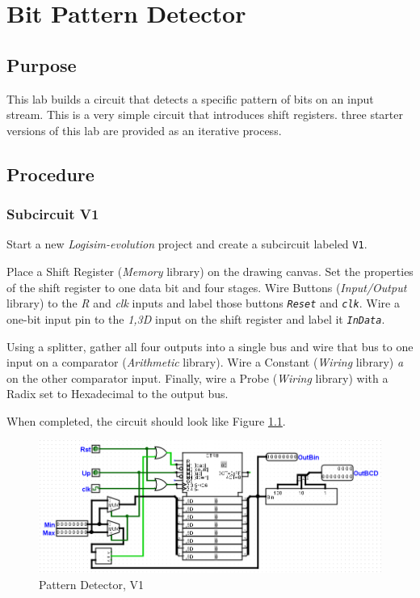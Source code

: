 \chapter{Bit Pattern Detector}

\section{Purpose}

This lab builds a circuit that detects a specific pattern of bits on an input stream. This is a very simple circuit that introduces shift registers. three starter versions of this lab are provided as an iterative process.

\section{Procedure}

\subsection{Subcircuit V1}

Start a new \textit{Logisim-evolution} project and create a subcircuit labeled \lstinline|V1|.

Place a Shift Register (\textit{Memory} library) on the drawing canvas. Set the properties of the shift register to one data bit and four stages. Wire Buttons (\textit{Input/Output} library) to the \textit{R} and \textit{clk} inputs and label those buttons \textit{\texttt{Reset}} and \textit{\texttt{clk}}. Wire a one-bit input pin to the \textit{1,3D} input on the shift register and label it \textit{\texttt{InData}}.

Using a splitter, gather all four outputs into a single bus and wire that bus to one input on a comparator (\textit{Arithmetic} library). Wire a Constant (\textit{Wiring} library) \textit{a} on the other comparator input. Finally, wire a Probe (\textit{Wiring} library) with a Radix set to Hexadecimal to the output bus.

When completed, the circuit should look like Figure \ref{fig:07-01}.

\begin{figure}[H]
	\centering
	\includegraphics[width=\maxwidth{.95\linewidth}]{gfx/07-01}
	\caption{Pattern Detector, V1}
	\label{fig:07-01}
\end{figure}

